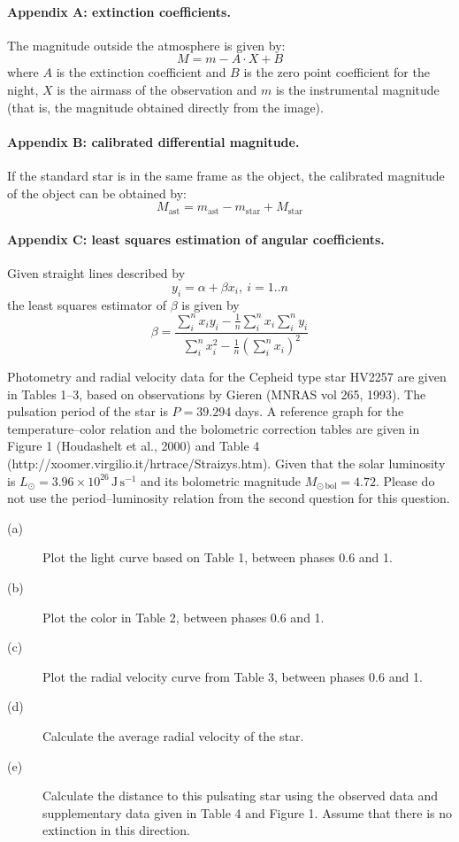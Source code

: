 \paragraph{Appendix A: extinction coefficients.}
The magnitude outside the atmosphere is given by:
\[ M = m - A\cdot X + B \]
where $A$ is the extinction coefficient and $B$ is the zero point coefficient
for the night, $X$ is the airmass of the observation and $m$ is the
instrumental magnitude (that is, the magnitude obtained directly from the
image).

\paragraph{Appendix B: calibrated differential magnitude.}
If the standard star is in the same frame as the object, the calibrated
magnitude of the object can be obtained by:
\[ M_{\mathrm{ast}} = m_{\mathrm{ast}} - m_{\mathrm{star}}
   + M_{\mathrm{star}} \]

\paragraph{Appendix C: least squares estimation of angular coefficients.}
Given straight lines described by
\[ y_i = \alpha + \beta x_i,\ i = 1..n \]
the least squares estimator of $\beta$ is given by
\[ \beta = \frac{\sum_i^n x_i y_i - \frac{1}{n}\sum_i^n x_i \sum_i^n y_i}
   {\sum_i^n x_i^2 - \frac{1}{n}\left(\sum_i^n x_i\right)^2} \]

Photometry and radial velocity data for the Cepheid type star HV2257 are
given in Tables 1--3, based on observations by Gieren (MNRAS vol 265, 1993).
The pulsation period of the star is $P = 39.294$ days. A reference graph for
the temperature--color relation and the bolometric correction tables are
given in Figure 1 (Houdashelt et al., 2000) and Table 4
(http://xoomer.virgilio.it/hrtrace/Straizys.htm). Given that the solar
luminosity is $L_\odot = 3.96 \times 10^{26}\,\mathrm{J\,s^{-1}}$ and its
bolometric magnitude $M_{\odot\,\mathrm{bol}} = 4.72$. Please do not use the
period--luminosity relation from the second question for this question.

\begin{description}
\item[(a)] Plot the light curve based on Table 1, between phases 0.6 and 1.
\item[(b)] Plot the color in Table 2, between phases 0.6 and 1.
\item[(c)] Plot the radial velocity curve from Table 3, between phases 0.6
  and 1.
\item[(d)] Calculate the average radial velocity of the star.
\item[(e)] Calculate the distance to this pulsating star using the observed
  data and supplementary data given in Table 4 and Figure 1. Assume that
  there is no extinction in this direction.
\end{description}

